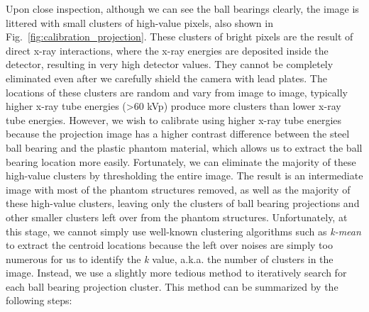 Upon close inspection, although we can see the ball bearings clearly, the image is littered with small clusters of high-value pixels, also shown in Fig.~\ref{fig:calibration_projection}.  These clusters of bright pixels are the result of direct x-ray interactions, where the x-ray energies are deposited inside the detector, resulting in very high detector values.  They cannot be completely eliminated even after we carefully shield the camera with lead plates.  The locations of these clusters are random and vary from image to image, typically higher x-ray tube energies (>60 kVp) produce more clusters than lower x-ray tube energies.  However, we wish to calibrate using higher x-ray tube energies because the projection image has a higher contrast difference between the steel ball bearing and the plastic phantom material, which allows us to extract the ball bearing location more easily.  Fortunately, we can eliminate the majority of these high-value clusters by thresholding the entire image.  The result is an intermediate image with most of the phantom structures removed, as well as the majority of these high-value clusters, leaving only the clusters of ball bearing projections and other smaller clusters left over from the phantom structures.  Unfortunately, at this stage, we cannot simply use well-known clustering algorithms such as \textit{k-mean} to extract the centroid locations because the left over noises are simply too numerous for us to identify the \textit{k} value, a.k.a. the number of clusters in the image.  Instead, we use a slightly more tedious method to iteratively search for each ball bearing projection cluster.  This method can be summarized by the following steps:
%
